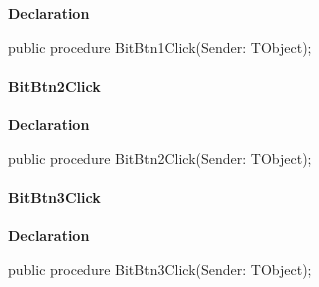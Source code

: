 \documentclass{report}
\newif\ifpdf
\begin{document}
\label{prjwizard.TfrmProjectWizard-BitBtn1Click}
\begin{list}{}{
\setlength{\itemindent}{0cm}
\setlength{\listparindent}{0cm}
\setlength{\leftmargin}{\evensidemargin}
\addtolength{\leftmargin}{\tmplength}
\settowidth{\labelsep}{X}
\addtolength{\leftmargin}{\labelsep}
\setlength{\labelwidth}{\tmplength}
}
\item[\textbf{Declaration}\hfill]
\ifpdf
\begin{flushleft}
\fi
\begin{ttfamily}
public procedure BitBtn1Click(Sender: TObject);\end{ttfamily}

\ifpdf
\end{flushleft}
\fi

\end{list}
\paragraph*{BitBtn2Click}\hspace*{\fill}

\label{prjwizard.TfrmProjectWizard-BitBtn2Click}
\begin{list}{}{
\setlength{\itemindent}{0cm}
\setlength{\listparindent}{0cm}
\setlength{\leftmargin}{\evensidemargin}
\addtolength{\leftmargin}{\tmplength}
\settowidth{\labelsep}{X}
\addtolength{\leftmargin}{\labelsep}
\setlength{\labelwidth}{\tmplength}
}
\item[\textbf{Declaration}\hfill]
\ifpdf
\begin{flushleft}
\fi
\begin{ttfamily}
public procedure BitBtn2Click(Sender: TObject);\end{ttfamily}

\ifpdf
\end{flushleft}
\fi

\end{list}
\paragraph*{BitBtn3Click}\hspace*{\fill}

\label{prjwizard.TfrmProjectWizard-BitBtn3Click}
\begin{list}{}{
\setlength{\itemindent}{0cm}
\setlength{\listparindent}{0cm}
\setlength{\leftmargin}{\evensidemargin}
\addtolength{\leftmargin}{\tmplength}
\settowidth{\labelsep}{X}
\addtolength{\leftmargin}{\labelsep}
\setlength{\labelwidth}{\tmplength}
}
\item[\textbf{Declaration}\hfill]
\ifpdf
\begin{flushleft}
\fi
\begin{ttfamily}
public procedure BitBtn3Click(Sender: TObject);\end{ttfamily}

\ifpdf
\end{flushleft}
\fi

\end{list}
\end{document}

